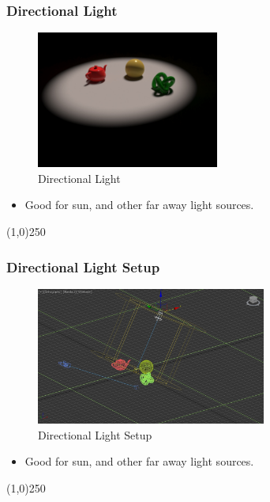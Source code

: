 \begin{frame}
	\frametitle{Directional Light}
	\begin{figure}
		\centering
		\includegraphics[height=4.5cm]{./Lights/DirectionalLight}
		\caption{Directional Light}
		\label{fig:DirectionalLight}
	\end{figure}
	\begin{itemize}
		\item Good for sun, and other far away light sources.
	\end{itemize}
\end{frame}
\begin{center}\line(1,0){250}\end{center}


\begin{frame}
	\frametitle{Directional Light Setup}
	\begin{figure}
		\centering
		\includegraphics[height=4.5cm]{./Lights/DirectionalLightSetup}
		\caption{Directional Light Setup}
		\label{fig:DirectionalLightSetup}
	\end{figure}
	\begin{itemize}
		\item Good for sun, and other far away light sources.
	\end{itemize}
\end{frame}
\begin{center}\line(1,0){250}\end{center}



